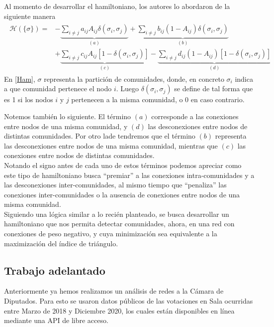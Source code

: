 \documentclass{proyectotesis}
\begin{document}
Al momento de desarrollar el hamiltoniano, los autores lo abordaron de la siguiente manera
\begin{align}
\begin{split}
    \mathcal{H}(\{\sigma\}) = &- \underbrace{\sum_{i\neq j} a_{ij}A_{ij}\delta(\sigma_i,\sigma_j)}_{(a)} + \underbrace{\sum_{i\neq j} b_{ij}(1 - A_{ij})\delta(\sigma_i,\sigma_j)}_{(b)} \\
                              &+ \underbrace{\sum_{i\neq j} c_{ij} A_{ij}[1 - \delta(\sigma_i,\sigma_j)] }_{(c)} - \underbrace{\sum_{i\neq j} d_{ij} (1-A_{ij})[1 - \delta(\sigma_i,\sigma_j)]}_{(d)}
\end{split}
\label{Ham}
\end{align}
En \eqref{Ham}, $\sigma$ representa la partición de comunidades, donde, en concreto $\sigma_i$ indica a que comunidad pertenece el nodo $i$. Luego $\delta(\sigma_i,\sigma_j)$ se define de tal forma que es 1 si los nodos $i$ y $j$ pertenecen a la misma comunidad, o 0 en caso contrario.

Notemos también lo siguiente. El término $(a)$ corresponde a las conexiones entre nodos de una misma comunidad, y $(d)$ las desconexiones entre nodos de distintas comunidades. Por otro lade tendremos que el término  $(b)$ representa las desconexiones entre nodos de una misma comunidad, mientras que $(c)$ las conexiones entre nodos de distintas comunidades.\\

Notando el signo antes de cada uno de estos términos podemos apreciar como este tipo de hamiltoniano busca ``premiar'' a las conexiones intra-comunidades y a las desconexiones inter-comunidades, al mismo tiempo que ``penaliza'' las conexiones inter-comunidades o la ausencia de conexiones entre nodos de una misma comunidad.
\\

Siguiendo una lógica similar a lo recién planteado, se busca desarrollar un hamiltoniano que nos permita detectar comunidades, ahora, en una red con conexiones de peso negativo, y cuya minimización sea equivalente a la maximización del índice de triángulo.

\subsection{Trabajo adelantado}
Anteriormente ya hemos realizamos un análisis de redes a la Cámara de Diputados. Para esto se usaron datos públicos de las votaciones en Sala ocurridas entre Marzo de 2018 y Diciembre 2020, los cuales están disponibles en línea mediante una API de libre acceso.\\ 
\end{document}
